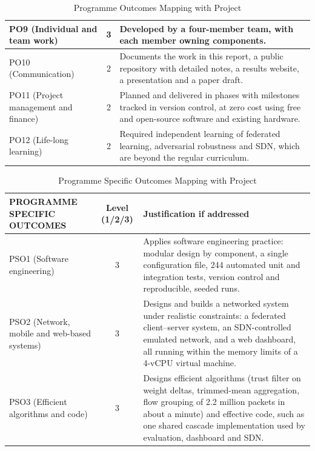 \documentclass[12pt,a4paper]{report}
\begin{document}
\begin{table}[h!]
\begin{tabular}{|>{\raggedright\arraybackslash}p{3.6cm}|c|p{7.9cm}|}
\hline
PO9 (Individual and team work) & 3 & Developed by a four-member team, with each member owning components. \\
\hline
PO10 (Communication) & 2 & Documents the work in this report, a public repository with detailed notes, a results website, a presentation and a paper draft. \\
\hline
PO11 (Project management and finance) & 2 & Planned and delivered in phases with milestones tracked in version control, at zero cost using free and open-source software and existing hardware. \\
\hline
PO12 (Life-long learning) & 2 & Required independent learning of federated learning, adversarial robustness and SDN, which are beyond the regular curriculum. \\
\hline
\end{tabular}
\caption{Programme Outcomes Mapping with Project}
\end{table}

\begin{table}[h!]
\centering
\small
\renewcommand{\arraystretch}{1.05} %
\setlength{\tabcolsep}{6pt}       %
\begin{tabular}{|>{\raggedright\arraybackslash}p{3.6cm}|c|p{7.9cm}|}
\hline
\textbf{PROGRAMME SPECIFIC OUTCOMES} & \textbf{Level (1/2/3)} & \textbf{Justification if addressed} \\
\hline
PSO1 (Software engineering) & 3 & Applies software engineering practice: modular design by component, a single configuration file, 244 automated unit and integration tests, version control and reproducible, seeded runs. \\
\hline
PSO2 (Network, mobile and web-based systems) & 3 & Designs and builds a networked system under realistic constraints: a federated client--server system, an SDN-controlled emulated network, and a web dashboard, all running within the memory limits of a 4-vCPU virtual machine. \\
\hline
PSO3 (Efficient algorithms and code) & 3 & Designs efficient algorithms (trust filter on weight deltas, trimmed-mean aggregation, flow grouping of 2.2 million packets in about a minute) and effective code, such as one shared cascade implementation used by evaluation, dashboard and SDN. \\
\hline
\end{tabular}
\caption{Programme Specific Outcomes Mapping with Project}
\end{table}
\clearpage

\clearpage
\end{document}
